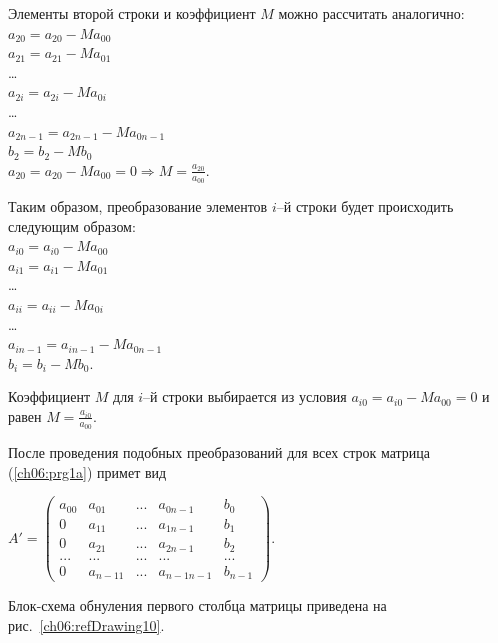 Элементы второй строки и коэффициент $M$ можно рассчитать аналогично:\\
$a_{20}=a_{20}-Ma_{00}$\\
$a_{21}=a_{21}-Ma_{01}$\\
…\\
$a_{2i}=a_{2i}-Ma_{0i}$\\
… \\
$a_{2n-1}=a_{2n-1}-Ma_{0n-1}$\\  
$b_2=b_2-Mb_0$\\
$a_{20}=a_{20}-Ma_{00}=0 \Rightarrow M=\frac{a_{20}}{a_{00}}$.

Таким образом, преобразование элементов $i$–й строки будет происходить следующим образом:\\
$a_{i0}=a_{i0}-Ma_{00}$\\  
$a_{i1}=a_{i1}-Ma_{01}$\\ 
…\\ 
$a_{ii}=a_{ii}-Ma_{0i}$\\
 …\\  
$a_{in-1}=a_{in-1}-Ma_{0n-1}$\\
$b_i=b_i-Mb_0$.

Коэффициент $M$ для $i$–й строки выбирается из условия
$a_{i0}=a_{i0}-Ma_{00}=0$
и равен 
 $M=\frac{a_{i0}}{a_{00}}$.

После проведения подобных преобразований для всех строк матрица (\ref{ch06:prg1a}) примет вид

$A'=\left(\begin{matrix}a_{00}&a_{01}&...&a_{0n-1}&b_0\\0&a_{11}&...&a_{1n-1}&b_1\\0&a_{21}&...&a_{2n-1}&b_2\\...&...&...&...&...\\0&a_{n-11}&...&a_{n-1n-1}&b_{n-1}\end{matrix}\right)$.

Блок-схема обнуления первого столбца матрицы приведена на рис.~\ref{ch06:refDrawing10}.

